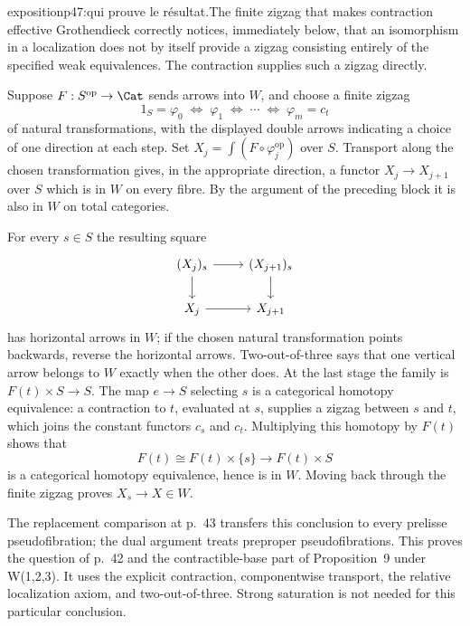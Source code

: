 \begin{dcomment}{exposition}{p47:qui prouve le résultat.}{The finite zigzag that makes contraction effective}
Grothendieck correctly notices, immediately below, that an isomorphism in a localization does not by itself provide a zigzag consisting entirely of the specified weak equivalences. The contraction supplies such a zigzag directly.

Suppose $F:S^{\mathrm{op}}\to\Cat$ sends arrows into $W$, and choose a finite zigzag
\[
 1_S=\varphi_0\;\Longleftrightarrow\;\varphi_1
 \;\Longleftrightarrow\;\cdots
 \;\Longleftrightarrow\;\varphi_m=c_t
\]
of natural transformations, with the displayed double arrows indicating a choice of one direction at each step. Set $X_j=\int(F\circ\varphi_j^{\mathrm{op}})$ over $S$. Transport along the chosen transformation gives, in the appropriate direction, a functor $X_j\to X_{j+1}$ over $S$ which is in $W$ on every fibre. By the argument of the preceding block it is also in $W$ on total categories.

For every $s\in S$ the resulting square
\[
\begin{tikzcd}
 (X_j)_s\arrow[r]\arrow[d] & (X_{j+1})_s\arrow[d]\\
 X_j\arrow[r] & X_{j+1}
\end{tikzcd}
\]
has horizontal arrows in $W$; if the chosen natural transformation points backwards, reverse the horizontal arrows. Two-out-of-three says that one vertical arrow belongs to $W$ exactly when the other does. At the last stage the family is $F(t)\times S\to S$. The map $e\to S$ selecting $s$ is a categorical homotopy equivalence: a contraction to $t$, evaluated at $s$, supplies a zigzag between $s$ and $t$, which joins the constant functors $c_s$ and $c_t$. Multiplying this homotopy by $F(t)$ shows that
\[
 F(t)\cong F(t)\times\{s\}\longrightarrow F(t)\times S
\]
is a categorical homotopy equivalence, hence is in $W$. Moving back through the finite zigzag proves $X_s\to X\in W$.

The replacement comparison at p.~43 transfers this conclusion to every prelisse pseudofibration; the dual argument treats preproper pseudofibrations. This proves the question of p.~42 and the contractible-base part of Proposition~9 under W(1,2,3). It uses the explicit contraction, componentwise transport, the relative localization axiom, and two-out-of-three. Strong saturation is not needed for this particular conclusion.
\end{dcomment}

